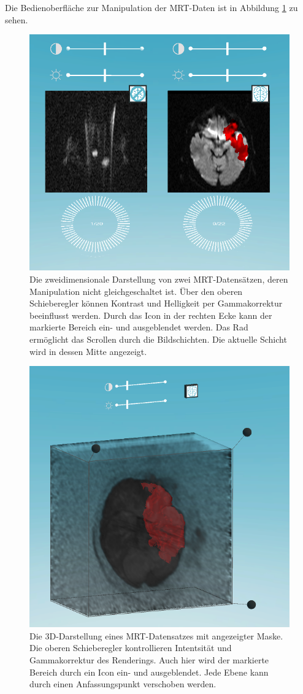 Die Bedienoberfläche zur Manipulation der MRT-Daten ist in Abbildung \ref{img:mARt2d} zu sehen.

\begin{figure}[!htb]
	\centering
	\includegraphics[width=0.5\linewidth]{images/mARt2d.png}
	\caption{Die zweidimensionale Darstellung von zwei MRT-Datensätzen, deren Manipulation nicht gleichgeschaltet ist. Über den oberen Schieberegler können Kontrast und Helligkeit per Gammakorrektur beeinflusst werden. Durch das Icon in der rechten Ecke kann der markierte Bereich ein- und ausgeblendet werden. Das Rad ermöglicht das Scrollen durch die Bildschichten. Die aktuelle Schicht wird in dessen Mitte angezeigt. }
	\label{img:mARt2d}
\end{figure}
\FloatBarrier

\begin{figure}[!htb]
	\centering
	\includegraphics[width=0.5\linewidth]{images/mARt3d.png}
	\caption{Die 3D-Darstellung eines MRT-Datensatzes mit angezeigter Maske. Die oberen Schieberegler kontrollieren Intentsität und Gammakorrektur des Renderings. Auch hier wird der markierte Bereich durch ein Icon ein- und ausgeblendet. Jede Ebene kann durch einen Anfassungspunkt verschoben werden.}
	\label{img:mARt3d}
\end{figure}
\FloatBarrier

